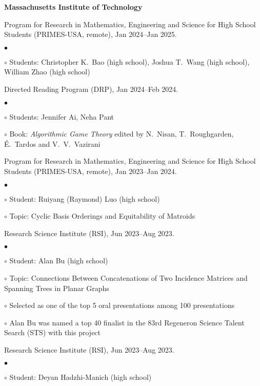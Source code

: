 \documentclass[margin,line]{res}
\newenvironment{list2}{
  \begin{list}{$\bullet$}{%
      \setlength{\itemsep}{0in}
      \setlength{\parsep}{0in} \setlength{\parskip}{0in}
      \setlength{\topsep}{0in} \setlength{\partopsep}{0in}
      \setlength{\leftmargin}{0.2in}}}{\end{list}}
\newenvironment{list3}{
  \begin{list}{\ding{113}}{%
      \setlength{\itemsep}{0.05in}
      \setlength{\parsep}{0.025in} \setlength{\parskip}{0in}
      \setlength{\topsep}{0in} \setlength{\partopsep}{0in}
      \setlength{\leftmargin}{0.17in}}}{\end{list}}
\begin{document}
\begin{resume}
{\bf Massachusetts Institute of Technology}\\
\vspace*{-.1in}
\begin{list3}
\item[] Program for Research in Mathematics, Engineering and Science for High School Students (PRIMES-USA, remote), Jan 2024--Jan 2025.
  \begin{list2}
  \item[$\circ$] Students: Christopher K.\ Bao (high school), Joshua T.\ Wang (high school), William Zhao (high school)
  \end{list2}
\item[] Directed Reading Program (DRP), Jan 2024--Feb 2024.
  \begin{list2}
  \item[$\circ$] Students: Jennifer Ai, Neha Pant
  \item[$\circ$] Book: \emph{Algorithmic Game Theory} edited by N.\ Nisan, T.\ Roughgarden, \'E.\ Tardos and V.\ V.\ Vazirani
  \end{list2}
\item[] Program for Research in Mathematics, Engineering and Science for High School Students (PRIMES-USA, remote), Jan 2023--Jan 2024.
  \begin{list2}
  \item[$\circ$] Student: Ruiyang (Raymond) Luo (high school)
  \item[$\circ$] Topic: Cyclic Basis Orderings and Equitability of Matroids
  \end{list2}
\item[] Research Science Institute (RSI), Jun 2023--Aug 2023.
  \begin{list2}
  \item[$\circ$] Student: Alan Bu (high school)
  \item[$\circ$] Topic: Connections Between Concatenations of Two Incidence Matrices and Spanning Trees in Planar Graphs
  \item[$\circ$] Selected as one of the top 5 oral presentations among 100 presentations
  \item[$\circ$] Alan Bu was named a top 40 finalist in the $83$rd Regeneron Science Talent Search (STS) with this project
  \end{list2}
\item[] Research Science Institute (RSI), Jun 2023--Aug 2023.
  \begin{list2}
  \item[$\circ$] Student: Deyan Hadzhi-Manich (high school)

\end{list2}
\end{list3}
\end{resume}
\end{document}

